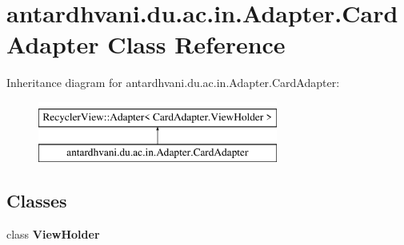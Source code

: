 \hypertarget{classantardhvani_1_1du_1_1ac_1_1in_1_1_adapter_1_1_card_adapter}{}\section{antardhvani.\+du.\+ac.\+in.\+Adapter.\+Card\+Adapter Class Reference}
\label{classantardhvani_1_1du_1_1ac_1_1in_1_1_adapter_1_1_card_adapter}
Inheritance diagram for antardhvani.\+du.\+ac.\+in.\+Adapter.\+Card\+Adapter\+:\begin{figure}[H]
\begin{center}
\leavevmode
\includegraphics[height=2.000000cm]{classantardhvani_1_1du_1_1ac_1_1in_1_1_adapter_1_1_card_adapter}
\end{center}
\end{figure}
\subsection*{Classes}
\begin{DoxyCompactItemize}
\item 
class {\bfseries View\+Holder}
\end{DoxyCompactItemize}
